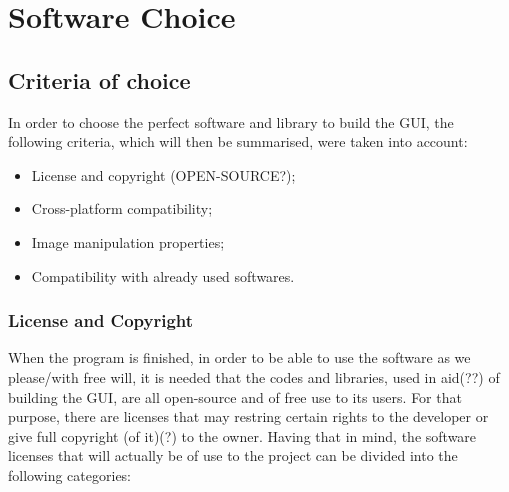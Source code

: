 





\chapter{Software Choice}
\label{cha:software_choice}



\section{Criteria of choice} 
\label{sub:criteria_of_choice}


In order to choose the perfect software and library to build the GUI, the following criteria, which will then be summarised, were taken into account:

\begin{itemize}
  \item License and copyright (OPEN-SOURCE?);
  \item Cross-platform compatibility;
  \item Image manipulation properties; %
  \item Compatibility with already used softwares. %
  
  
\end{itemize}

\subsection{License and Copyright}
\label{sub:license_and_copyright}

When the program is finished, in order to be able to use the software as we please/with free will, it is needed that the codes and libraries, used in aid(??) of building the GUI, are all open-source and of free use to its users. For that purpose, there are licenses that may restring certain rights to the developer or give full copyright (of it)(?) to the owner. Having that in mind, the software licenses that will actually be of use to the project can be divided into the following categories:

